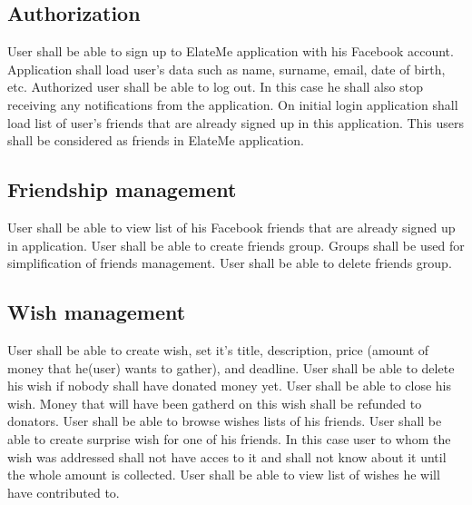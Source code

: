\subsection*{Authorization}
\begin{itemize}
User shall be able to sign up to ElateMe application with his Facebook account. Application shall load user's data
such as name, surname, email, date of birth, etc.
Authorized user shall be able to log out. In this case he shall also stop receiving any notifications from the
application.
On initial login application shall load list of user's friends that are already signed up in this application. This
users shall be considered as friends in ElateMe application.
\end{itemize}

\subsection*{Friendship management}

\begin{itemize}
User shall be able to view list of his Facebook friends that are already signed up in application.
User shall be able to create friends group. Groups shall be used for simplification of friends management.
User shall be able to delete friends group.
\end{itemize}

\subsection*{Wish management}

\begin{itemize}
User shall be able to create wish, set it's title, description, price (amount of money that he(user) wants to gather),
and deadline.
User shall be able to delete his wish if nobody shall have donated money yet.
User shall be able to close his wish. Money that will have been gatherd on this wish shall be refunded to donators.
User shall be able to browse wishes lists of his friends.
User shall be able to create surprise wish for one of his friends. In this case user to whom the wish was addressed
shall not have acces to it and shall not know about it until the whole amount is collected.
User shall be able to view list of wishes he will have contributed to.
\end{itemize}

